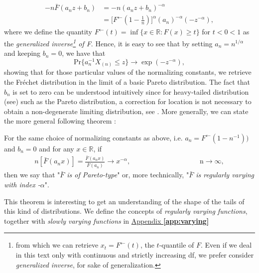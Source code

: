 \begin{equation*}
\begin{aligned}
-n\bar{F}(a_nz+b_n)
& =-n(a_nz+b_n)^{-\alpha} \\
& =\Big[F^{\leftarrow}(1-\frac{1}{n})\Big]^{\alpha}(a_n)^{-\alpha}(-z^{-\alpha}),
\end{aligned}
\end{equation*}
where we define the quantity $F^{\leftarrow}(t)=\inf\{x\in\mathbb{R}:F(x)\geq t\}$ for $t<0<1$ as the \emph{generalized inverse\footnote{from which we can retrieve $x_t=F^{\leftarrow}(t)$, the $t$-quantile of $F$. Even if we deal in this text only with continuous and strictly increasing df, we prefer consider \emph{generalized inverse}, for sake of generalization.} of F}.
Hence, it is easy to see that by setting $a_n=n^{1/\alpha}$ and keeping $b_n=0$, we have that 
\begin{equation*}
\text{Pr}\{a_n^{-1}X_{(n)}\leq z\}\rightarrow \exp (-z^{-\alpha}),
\end{equation*}
showing that for those particular values of the normalizing constants, we retrieve the Fréchet distribution in the limit of a basic Pareto distribution. The fact that $b_n$ is set to zero can be understood intuitively since for heavy-tailed distribution (see) such as the Pareto distribution, a correction for location is not necessary to obtain a non-degenerate limiting distribution, see \citet[pp.51]{beirlant_practical_1996}.
More generally, we can state the more general following theorem :
\begin{theorem} For the same choice of normalizing constants as above, i.e. $a_n=F^{\leftarrow}(1-n^{-1}))$ and $b_n=0$ and for any $x\in\mathbb{R}$, if
	\begin{equation}
	\begin{aligned}
	n[\bar{F}(a_nx)]= \frac{\bar{F}(a_nx)}{\bar{F}(a_n)}\rightarrow x^{-\alpha} ,&&&&&&&&&&&& \text{ n}\to\infty,
	\end{aligned}
	\end{equation}
	then we say that "\emph{$\bar{F}$ is of Pareto-type}" or, more technically, "\emph{$\bar{F}$ is regularly varying with index -$\alpha$}".
\end{theorem}

This theorem is interesting to get an understanding of the shape of the tails of this kind of distributions. 
We define the concepts of \emph{regularly varying functions}, together with \emph{slowly varying functions} in \hyperref[app:varying]{Appendix \textbf{\ref{app:varying}}}

